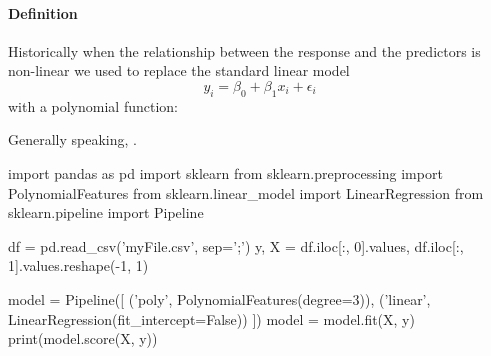 \paragraph{Definition}
Historically when the relationship between the response and the
predictors is non-linear we used to replace the standard linear model
$$
y_{i}=\beta_{0}+\beta_{1}x_{i}+\epsilon_{i}
$$
with a polynomial function:
\begin{center}
\end{center}
Generally speaking, .

\begin{python}
import pandas as pd
import sklearn
from sklearn.preprocessing import PolynomialFeatures
from sklearn.linear_model import LinearRegression
from sklearn.pipeline import Pipeline

df = pd.read_csv('myFile.csv', sep=';')
y, X = df.iloc[:, 0].values, df.iloc[:, 1].values.reshape(-1, 1)

model = Pipeline([
  ('poly', PolynomialFeatures(degree=3)),
  ('linear', LinearRegression(fit_intercept=False))
  ])
model = model.fit(X, y)
print(model.score(X, y))
\end{python}

